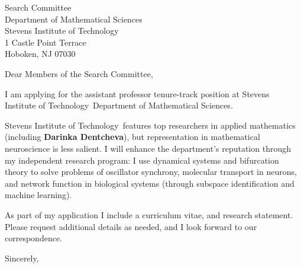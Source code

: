 \documentclass[11pt,a4paper]{letter}
\begin{document}

\def\School{Stevens Institute of Technology}

\begin{letter}
{Search Committee\\
Department of Mathematical Sciences\\
Stevens Institute of Technology\\
1 Castle Point Terrace\\
Hoboken, NJ 07030}


\opening{Dear Members of the Search Committee,}

I am applying for the assistant professor tenure-track position at \School~Department of Mathematical Sciences. 



\School~features top researchers in applied mathematics (including \textbf{Darinka Dentcheva}), but representation in mathematical neuroscience is less salient. I will enhance the department's reputation through my independent research program: I use dynamical systems and bifurcation theory to solve problems of oscillator synchrony, molecular transport in neurons, and network function in biological systems (through subspace identification and machine learning).



As part of my application I include a curriculum vitae, and research statement. Please request additional details as needed, and I look forward to our correspondence.

\closing{Sincerely,}
\end{letter}
\end{document}
